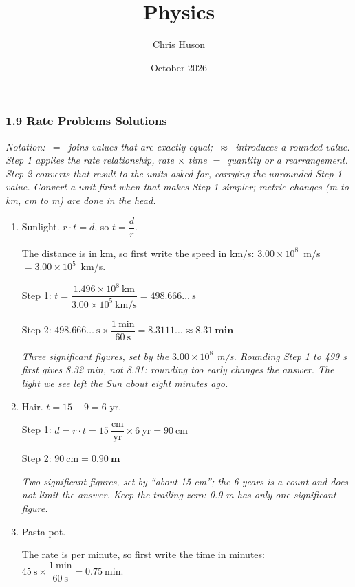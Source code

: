 \documentclass[12pt, twoside]{article}
\title{Physics}
\author{Chris Huson}
\date{October 2026}
\begin{document}
\subsubsection*{1.9 Rate Problems Solutions}

\emph{Notation: \,$=$\, joins values that are exactly equal; \,$\approx$\, introduces a
rounded value. Step 1 applies the rate relationship, rate $\times$ time $=$ quantity or
a rearrangement. Step 2 converts that result to the units asked for, carrying the
unrounded Step 1 value. Convert a unit first when that makes Step 1 simpler; metric
changes (m to km, cm to m) are done in the head.}

\begin{enumerate}[itemsep=0.4cm]

\item Sunlight. \quad $r \cdot t = d$, so $t = \dfrac{d}{r}$.

  The distance is in km, so first write the speed in km/s:
  \mbox{$3.00 \times 10^{8}$ m/s $= 3.00 \times 10^{5}$ km/s.}

  Step 1: \quad $t = \dfrac{1.496 \times 10^{8}~\text{km}}{3.00 \times 10^{5}~\text{km/s}}
  = 498.666\ldots~\text{s}$

  Step 2: \quad $498.666\ldots~\text{s} \times \dfrac{1~\text{min}}{60~\text{s}}
  = 8.3111\ldots \approx \mathbf{8.31~\textbf{min}}$

  \emph{Three significant figures, set by the $3.00 \times 10^{8}$ m/s. Rounding Step 1
  to 499 s first gives 8.32 min, not 8.31: rounding too early changes the answer.
  The light we see left the Sun about eight minutes ago.}

\item Hair. \quad $t = 15 - 9 = 6$ yr.

  Step 1: \quad $d = r \cdot t = 15~\dfrac{\text{cm}}{\text{yr}} \times 6~\text{yr}
  = 90~\text{cm}$

  Step 2: \quad $90~\text{cm} = \mathbf{0.90~\textbf{m}}$

  \emph{Two significant figures, set by ``about 15 cm''; the 6 years is a count and does
  not limit the answer. Keep the trailing zero: 0.9 m has only one significant figure.}

\newpage

\item Pasta pot.

  The rate is per minute, so first write the time in minutes:
  $45~\text{s} \times \dfrac{1~\text{min}}{60~\text{s}} = 0.75~\text{min}$.


\end{enumerate}
\end{document}

